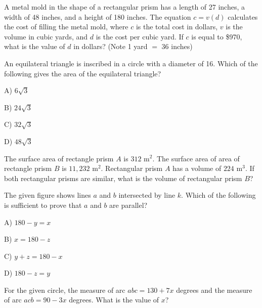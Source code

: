 \vfill
\noindent\begin{minipage}{\linewidth}
\par\smallskip
A metal mold in the shape of a rectangular prism has a length of 27 inches, a width of 48 inches, and a height of 180 inches. The equation $c=v(d)$ calculates the cost of filling the metal mold, where $c$ is the total cost in dollars, $v$ is the volume in cubic yards, and $d$ is the cost per cubic yard. If $c$ is equal to \$970, what is the value of $d$ in dollars? (Note 1 yard $=$ 36 inches)
\end{minipage}
\vfill
\noindent\begin{minipage}{\linewidth}
\par\smallskip
An equilateral triangle is inscribed in a circle with a diameter of 16. Which of the following gives the area of the equilateral triangle?
\begin{satchoices}
  \item[A)] $6\sqrt{3}$
  \item[B)] $24\sqrt{3}$
  \item[C)] $32\sqrt{3}$
  \item[D)] $48\sqrt{3}$
\end{satchoices}
\end{minipage}
\vfill
\clearpage
\noindent\begin{minipage}{\linewidth}
\par\smallskip
The surface area of rectangle prism $A$ is $312$ m$^2$. The surface area of area of rectangle prism $B$ is $11{,}232$ m$^2$. Rectangular prism $A$ has a volume of $224$ m$^3$. If both rectangular prisms are similar, what is the volume of rectangular prism $B$?
\end{minipage}
\vfill
\noindent\begin{minipage}{\linewidth}
\par\smallskip
The given figure shows lines $a$ and $b$ intersected by line $k$. Which of the following is sufficient to prove that $a$ and $b$ are parallel?
\satfig{\figlinesabk}
\satnotetoscale
\begin{satchoices}
  \item[A)] $180-y=x$
  \item[B)] $x=180-z$
  \item[C)] $y+z=180-x$
  \item[D)] $180-z=y$
\end{satchoices}
\end{minipage}
\vfill
\noindent\begin{minipage}{\linewidth}
\par\smallskip
For the given circle, the measure of arc $abc=130+7x$ degrees and the measure of arc $acb=90-3x$ degrees. What is the value of $x$?
\satfig{\figcirclearc}
\end{minipage}
